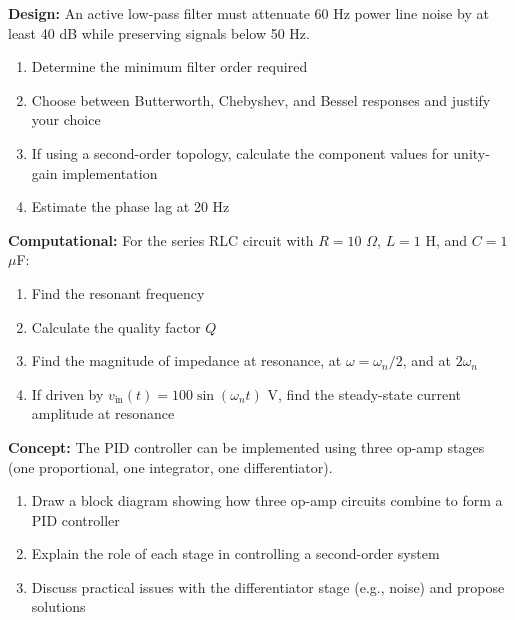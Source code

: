 \begin{exercise}
\textbf{Design:} An active low-pass filter must attenuate 60 Hz power line noise by at least 40 dB while preserving signals below 50 Hz.

\begin{enumerate}[label=(\alph*)]
    \item Determine the minimum filter order required
    \item Choose between Butterworth, Chebyshev, and Bessel responses and justify your choice
    \item If using a second-order topology, calculate the component values for unity-gain implementation
    \item Estimate the phase lag at 20 Hz
\end{enumerate}
\end{exercise}

\begin{exercise}
\textbf{Computational:} For the series RLC circuit with $R = 10$ $\Omega$, $L = 1$ H, and $C = 1$ $\mu$F:

\begin{enumerate}[label=(\alph*)]
    \item Find the resonant frequency
    \item Calculate the quality factor $Q$
    \item Find the magnitude of impedance at resonance, at $\omega = \omega_n/2$, and at $2\omega_n$
    \item If driven by $v_{\text{in}}(t) = 100\sin(\omega_n t)$ V, find the steady-state current amplitude at resonance
\end{enumerate}
\end{exercise}

\begin{exercise}
\textbf{Concept:} The PID controller can be implemented using three op-amp stages (one proportional, one integrator, one differentiator).

\begin{enumerate}[label=(\alph*)]
    \item Draw a block diagram showing how three op-amp circuits combine to form a PID controller
    \item Explain the role of each stage in controlling a second-order system
    \item Discuss practical issues with the differentiator stage (e.g., noise) and propose solutions
\end{enumerate}
\end{exercise}
